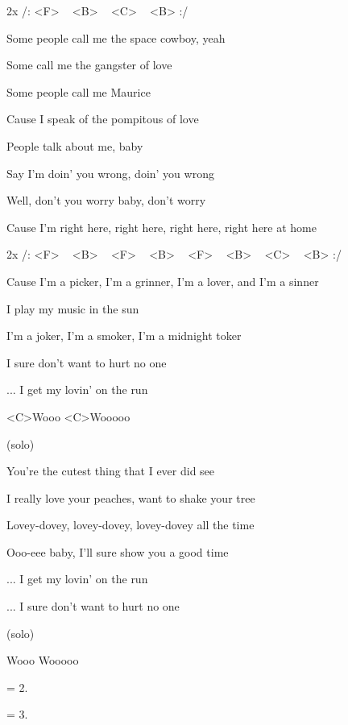 
2x /: <F> ~ <B> ~ <C> ~ <B> :/

\zs
Some people call me the space cowboy, yeah

Some call me the gangster of love

Some people call me Maurice

Cause I speak of the pompitous of love
\ks

\zs
People talk about me, baby

Say I'm doin' you wrong, doin' you wrong

Well, don't you worry baby, don't worry

Cause I'm right here, right here, right here, right here at home
\ks

\zr
2x /: <F> ~ <B> ~ <F> ~ <B> ~ <F> ~ <B> ~ <C> ~ <B> :/

Cause I'm a picker, I'm a grinner, I'm a lover, and I'm a sinner

I play my music in the sun

I'm a joker, I'm a smoker, I'm a midnight toker

I sure don't want to hurt no one

... I get my lovin' on the run

<C>Wooo <C>Wooooo
\kr

\zs
(solo)
\ks

\zs
You're the cutest thing that I ever did see

I really love your peaches, want to shake your tree

Lovey-dovey, lovey-dovey, lovey-dovey all the time

Ooo-eee baby, I'll sure show you a good time
\ks

\zr
... I get my lovin' on the run

...  I sure don't want to hurt no one

(solo)

Wooo Wooooo

\kr

\zr\kr

\zs
= 2.
\ks

\zs
= 3.
\ks
\kp
